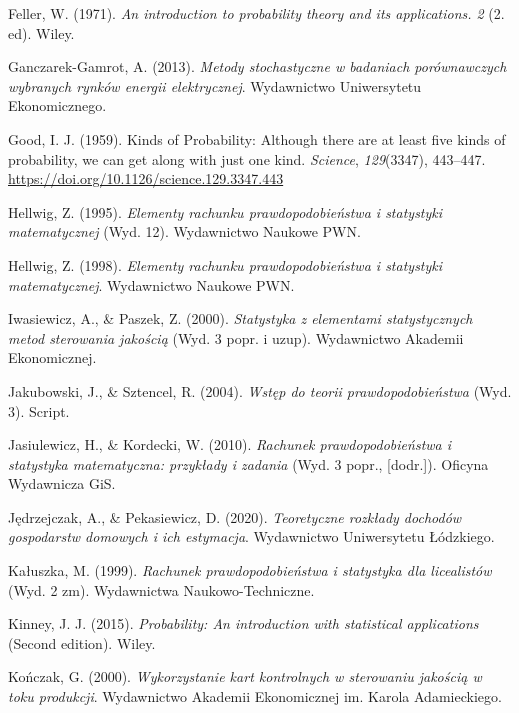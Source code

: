 \documentclass[
  letterpaper,
  DIV=11,
  numbers=noendperiod]{scrreprt}
\newlength{\cslhangindent}
\newenvironment{CSLReferences}[2] %
 {\begin{list}{}{%
  \setlength{\itemindent}{0pt}
  \setlength{\leftmargin}{0pt}
  \setlength{\parsep}{0pt}
  \ifodd #1
   \setlength{\leftmargin}{\cslhangindent}
   \setlength{\itemindent}{-1\cslhangindent}
  \fi
  \setlength{\itemsep}{#2\baselineskip}}}
 {\end{list}}
\begin{document}
\begin{CSLReferences}{1}{0}
Feller, W. (1971). \emph{An introduction to probability theory and its
applications. 2} (2. ed). Wiley.

Ganczarek-Gamrot, A. (2013). \emph{Metody stochastyczne w badaniach
porównawczych wybranych rynków energii elektrycznej}. Wydawnictwo
Uniwersytetu Ekonomicznego.

Good, I. J. (1959). Kinds of Probability: Although there are at least
five kinds of probability, we can get along with just one kind.
\emph{Science}, \emph{129}(3347), 443--447.
\url{https://doi.org/10.1126/science.129.3347.443}

Hellwig, Z. (1995). \emph{Elementy rachunku prawdopodobie{ń}stwa i
statystyki matematycznej} (Wyd. 12). Wydawnictwo Naukowe PWN.

Hellwig, Z. (1998). \emph{Elementy rachunku prawdopodobie{ń}stwa i
statystyki matematycznej}. Wydawnictwo Naukowe PWN.

Iwasiewicz, A., \& Paszek, Z. (2000). \emph{Statystyka z elementami
statystycznych metod sterowania jako{ś}ci{ą}} (Wyd. 3 popr. i uzup).
Wydawnictwo Akademii Ekonomicznej.

Jakubowski, J., \& Sztencel, R. (2004). \emph{Wst{ę}p do teorii
prawdopodobie{ń}stwa} (Wyd. 3). Script.

Jasiulewicz, H., \& Kordecki, W. (2010). \emph{Rachunek
prawdopodobie{ń}stwa i statystyka matematyczna: przyk{ł}ady i zadania}
(Wyd. 3 popr., {[}dodr.{]}). Oficyna Wydawnicza GiS.

Jędrzejczak, A., \& Pekasiewicz, D. (2020). \emph{Teoretyczne rozkłady
dochodów gospodarstw domowych i ich estymacja}. Wydawnictwo Uniwersytetu
{Ł}ódzkiego.

Kałuszka, M. (1999). \emph{Rachunek prawdopodobie{ń}stwa i statystyka
dla licealistów} (Wyd. 2 zm). Wydawnictwa Naukowo-Techniczne.

Kinney, J. J. (2015). \emph{Probability: An introduction with
statistical applications} (Second edition). Wiley.

Kończak, G. (2000). \emph{Wykorzystanie kart kontrolnych w sterowaniu
jako{ś}ci{ą} w toku produkcji}. Wydawnictwo Akademii Ekonomicznej im.
Karola Adamieckiego.


\end{CSLReferences}
\end{document}
